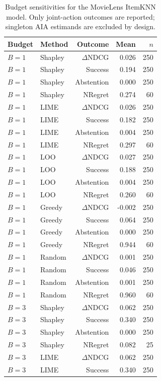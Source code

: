 \begin{table}[t]\centering\scriptsize
\caption{Budget sensitivities for the MovieLens ItemKNN model. Only joint-action outcomes are reported; singleton AIA estimands are excluded by design.}
\label{tab:sensitivity}
\begin{tabular}{llrrr}
\toprule
Budget & Method & Outcome & Mean & $n$ \\
\midrule
$B=1$ & Shapley & $\Delta$NDCG & 0.026 & 250 \\
$B=1$ & Shapley & Success & 0.194 & 250 \\
$B=1$ & Shapley & Abstention & 0.000 & 250 \\
$B=1$ & Shapley & NRegret & 0.274 & 60 \\
$B=1$ & LIME & $\Delta$NDCG & 0.026 & 250 \\
$B=1$ & LIME & Success & 0.182 & 250 \\
$B=1$ & LIME & Abstention & 0.004 & 250 \\
$B=1$ & LIME & NRegret & 0.297 & 60 \\
$B=1$ & LOO & $\Delta$NDCG & 0.027 & 250 \\
$B=1$ & LOO & Success & 0.188 & 250 \\
$B=1$ & LOO & Abstention & 0.004 & 250 \\
$B=1$ & LOO & NRegret & 0.260 & 60 \\
$B=1$ & Greedy & $\Delta$NDCG & -0.002 & 250 \\
$B=1$ & Greedy & Success & 0.064 & 250 \\
$B=1$ & Greedy & Abstention & 0.000 & 250 \\
$B=1$ & Greedy & NRegret & 0.944 & 60 \\
$B=1$ & Random & $\Delta$NDCG & 0.001 & 250 \\
$B=1$ & Random & Success & 0.046 & 250 \\
$B=1$ & Random & Abstention & 0.001 & 250 \\
$B=1$ & Random & NRegret & 0.960 & 60 \\
\midrule
$B=3$ & Shapley & $\Delta$NDCG & 0.062 & 250 \\
$B=3$ & Shapley & Success & 0.340 & 250 \\
$B=3$ & Shapley & Abstention & 0.000 & 250 \\
$B=3$ & Shapley & NRegret & 0.082 & 25 \\
$B=3$ & LIME & $\Delta$NDCG & 0.062 & 250 \\
$B=3$ & LIME & Success & 0.340 & 250 \\

\end{tabular}
\end{table}
